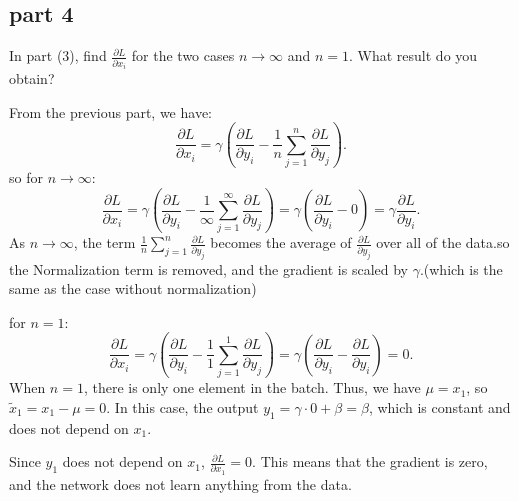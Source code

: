 \subsection{part 4}
In part (3), find \( \frac{\partial L}{\partial x_i} \) for the two cases \( n \to \infty \) and \( n = 1 \). What result do you obtain?
\begin{qsolve}
    \begin{qsolve}[]
        From the previous part, we have:
        \splitqsolve[\splitqsolve]
        \[
        \frac{\partial L}{\partial x_i} = \gamma \left(\frac{\partial L}{\partial y_i} - \frac{1}{n} \sum_{j=1}^n \frac{\partial L}{\partial y_j}\right).
        \]
        so for \( n \to \infty \):
        \[
        \frac{\partial L}{\partial x_i} = \gamma \left(\frac{\partial L}{\partial y_i} - \frac{1}{\infty} \sum_{j=1}^\infty \frac{\partial L}{\partial y_j}\right) = \gamma \left(\frac{\partial L}{\partial y_i} - 0\right) = \gamma \frac{\partial L}{\partial y_i}.
        \]
        As \( n \to \infty \), the term \( \frac{1}{n} \sum_{j=1}^n \frac{\partial L}{\partial y_j} \) becomes the average of \( \frac{\partial L}{\partial y_j} \) over all of the data.so the Normalization term is removed, and the gradient is scaled by \( \gamma \).(which is the same as the case without normalization)
        
        for \( n = 1 \):
        \[
        \frac{\partial L}{\partial x_i} = \gamma \left(\frac{\partial L}{\partial y_i} - \frac{1}{1} \sum_{j=1}^1 \frac{\partial L}{\partial y_j}\right) = \gamma \left(\frac{\partial L}{\partial y_i} - \frac{\partial L}{\partial y_i}\right) = 0.
        \]
        When \( n = 1 \), there is only one element in the batch. Thus, we have \( \mu = x_1 \), so \( \tilde{x}_1 = x_1 - \mu = 0 \). In this case, the output \( y_1 = \gamma \cdot 0 + \beta = \beta \), which is constant and does not depend on \( x_1 \).

        Since \( y_1 \) does not depend on \( x_1 \), \( \frac{\partial L}{\partial x_1} = 0 \). This means that the gradient is zero, and the network does not learn anything from the data. 

    \end{qsolve}
\end{qsolve}